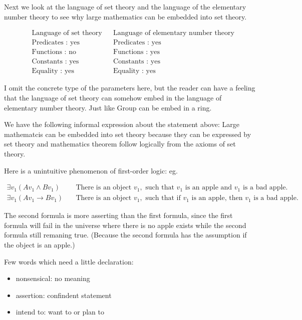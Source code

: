 \documentclass[11pt]{article}
\begin{document}
Next we look at the language of set theory and the language of the elementary number theory to see why large mathematics can be embedded into set theory.

\begin{align*}
& \text{Language of set theory} && \text{Language of elementary number theory} \\
& \text{Predicates : yes} &&  \text{Predicates : yes}\\
& \text{Functions : no} &&  \text{Functions : yes}\\
& \text{Constants : yes} && \text{Constants : yes}\\
& \text{Equality : yes} && \text{Equality : yes}
\end{align*}

I omit the concrete type of the parameters here, but the reader can have a feeling that the language of set theory can somehow embed in the language of elementary number theory. Just like Group can be embed in a ring.

We have the following informal expression about the statement above:
Large mathematcis can be embedded into set theory because they can be expressed by set theory and mathematics theorem follow logically from the axioms of set theory.

Here is a unintuitive phenomenon of first-order logic:
eg.

\begin{align*}
\exists v_1 (Av_1 \land Bv_1) & \quad \text{There is an object } v_1, \text{ such that } v_1 \text{ is an apple and } v_1 \text{ is a bad apple.} \\
\exists v_1 (Av_1 \to Bv_1) & \quad \text{There is an object } v_1, \text{ such that if } v_1 \text{ is an apple, then } v_1 \text{ is a bad apple.}
\end{align*}

The second formula is more asserting than the first formula, since the first formula will fail in the universe where there is no apple exists while the second formula still remaning true. (Because the second formula has the assumption if the object is an apple.)

Few words which need a little declaration:
\begin{itemize}
\item nonsensical: no meaning
\item assertion: confindent statement
\item intend to: want to or plan to
\end{itemize}
\end{document}
